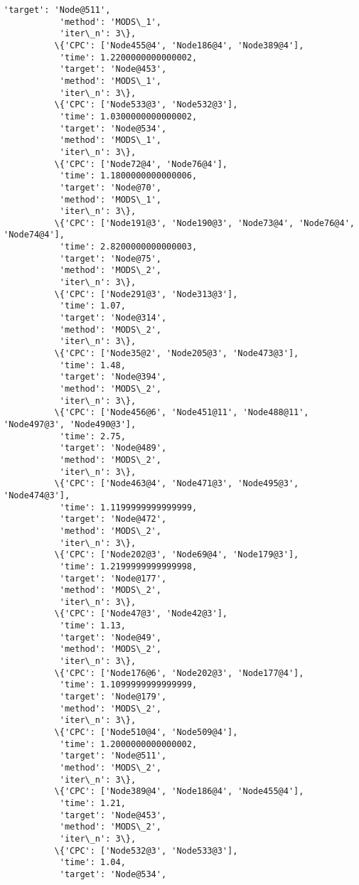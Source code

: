 \documentclass[11pt]{article}
\begin{document}
\begin{Verbatim}[commandchars=\\\{\}]
           'target': 'Node@511',
           'method': 'MODS\_1',
           'iter\_n': 3\},
          \{'CPC': ['Node455@4', 'Node186@4', 'Node389@4'],
           'time': 1.2200000000000002,
           'target': 'Node@453',
           'method': 'MODS\_1',
           'iter\_n': 3\},
          \{'CPC': ['Node533@3', 'Node532@3'],
           'time': 1.0300000000000002,
           'target': 'Node@534',
           'method': 'MODS\_1',
           'iter\_n': 3\},
          \{'CPC': ['Node72@4', 'Node76@4'],
           'time': 1.1800000000000006,
           'target': 'Node@70',
           'method': 'MODS\_1',
           'iter\_n': 3\},
          \{'CPC': ['Node191@3', 'Node190@3', 'Node73@4', 'Node76@4', 'Node74@4'],
           'time': 2.8200000000000003,
           'target': 'Node@75',
           'method': 'MODS\_2',
           'iter\_n': 3\},
          \{'CPC': ['Node291@3', 'Node313@3'],
           'time': 1.07,
           'target': 'Node@314',
           'method': 'MODS\_2',
           'iter\_n': 3\},
          \{'CPC': ['Node35@2', 'Node205@3', 'Node473@3'],
           'time': 1.48,
           'target': 'Node@394',
           'method': 'MODS\_2',
           'iter\_n': 3\},
          \{'CPC': ['Node456@6', 'Node451@11', 'Node488@11', 'Node497@3', 'Node490@3'],
           'time': 2.75,
           'target': 'Node@489',
           'method': 'MODS\_2',
           'iter\_n': 3\},
          \{'CPC': ['Node463@4', 'Node471@3', 'Node495@3', 'Node474@3'],
           'time': 1.1199999999999999,
           'target': 'Node@472',
           'method': 'MODS\_2',
           'iter\_n': 3\},
          \{'CPC': ['Node202@3', 'Node69@4', 'Node179@3'],
           'time': 1.2199999999999998,
           'target': 'Node@177',
           'method': 'MODS\_2',
           'iter\_n': 3\},
          \{'CPC': ['Node47@3', 'Node42@3'],
           'time': 1.13,
           'target': 'Node@49',
           'method': 'MODS\_2',
           'iter\_n': 3\},
          \{'CPC': ['Node176@6', 'Node202@3', 'Node177@4'],
           'time': 1.1099999999999999,
           'target': 'Node@179',
           'method': 'MODS\_2',
           'iter\_n': 3\},
          \{'CPC': ['Node510@4', 'Node509@4'],
           'time': 1.2000000000000002,
           'target': 'Node@511',
           'method': 'MODS\_2',
           'iter\_n': 3\},
          \{'CPC': ['Node389@4', 'Node186@4', 'Node455@4'],
           'time': 1.21,
           'target': 'Node@453',
           'method': 'MODS\_2',
           'iter\_n': 3\},
          \{'CPC': ['Node532@3', 'Node533@3'],
           'time': 1.04,
           'target': 'Node@534',

\end{Verbatim}
\end{document}

